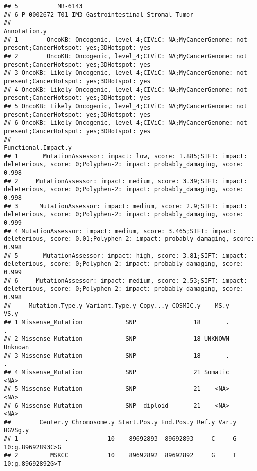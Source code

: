 \documentclass[
]{article}
\begin{document}
\begin{verbatim}
## 5           MB-6143                               
## 6 P-0002672-T01-IM3 Gastrointestinal Stromal Tumor
##                                                                                                Annotation.y
## 1        OncoKB: Oncogenic, level_4;CIViC: NA;MyCancerGenome: not present;CancerHotspot: yes;3DHotspot: yes
## 2        OncoKB: Oncogenic, level_4;CIViC: NA;MyCancerGenome: not present;CancerHotspot: yes;3DHotspot: yes
## 3 OncoKB: Likely Oncogenic, level_4;CIViC: NA;MyCancerGenome: not present;CancerHotspot: yes;3DHotspot: yes
## 4 OncoKB: Likely Oncogenic, level_4;CIViC: NA;MyCancerGenome: not present;CancerHotspot: yes;3DHotspot: yes
## 5 OncoKB: Likely Oncogenic, level_4;CIViC: NA;MyCancerGenome: not present;CancerHotspot: yes;3DHotspot: yes
## 6 OncoKB: Likely Oncogenic, level_4;CIViC: NA;MyCancerGenome: not present;CancerHotspot: yes;3DHotspot: yes
##                                                                                                                         Functional.Impact.y
## 1       MutationAssessor: impact: low, score: 1.885;SIFT: impact: deleterious, score: 0;Polyphen-2: impact: probably_damaging, score: 0.998
## 2     MutationAssessor: impact: medium, score: 3.39;SIFT: impact: deleterious, score: 0;Polyphen-2: impact: probably_damaging, score: 0.998
## 3      MutationAssessor: impact: medium, score: 2.9;SIFT: impact: deleterious, score: 0;Polyphen-2: impact: probably_damaging, score: 0.999
## 4 MutationAssessor: impact: medium, score: 3.465;SIFT: impact: deleterious, score: 0.01;Polyphen-2: impact: probably_damaging, score: 0.998
## 5       MutationAssessor: impact: high, score: 3.81;SIFT: impact: deleterious, score: 0;Polyphen-2: impact: probably_damaging, score: 0.999
## 6     MutationAssessor: impact: medium, score: 2.53;SIFT: impact: deleterious, score: 0;Polyphen-2: impact: probably_damaging, score: 0.998
##     Mutation.Type.y Variant.Type.y Copy...y COSMIC.y    MS.y    VS.y
## 1 Missense_Mutation            SNP                18       .       .
## 2 Missense_Mutation            SNP                18 UNKNOWN Unknown
## 3 Missense_Mutation            SNP                18       .       .
## 4 Missense_Mutation            SNP                21 Somatic    <NA>
## 5 Missense_Mutation            SNP                21    <NA>    <NA>
## 6 Missense_Mutation            SNP  diploid       21    <NA>    <NA>
##        Center.y Chromosome.y Start.Pos.y End.Pos.y Ref.y Var.y          HGVSg.y
## 1             .           10    89692893  89692893     C     G 10:g.89692893C>G
## 2         MSKCC           10    89692892  89692892     G     T 10:g.89692892G>T

\end{verbatim}
\end{document}
